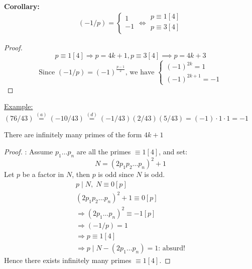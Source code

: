 \documentclass{report}
\begin{document}
\textbf{Corollary:}\[(-1/p)=\left \{ \begin{array}{lcl}
																			1\\
																			-1\\
																			\end{array}
																			\right. \iff 
																			\begin{array}{lcl}
																			p\equiv 1[4]\\
																			p\equiv 3[4]\\
																			\end{array}\]
\begin{proof}
							\[p\equiv1[4] \Rightarrow p=4k+1, p\equiv 3[4] \implies p=4k+3\]
							\[\text{Since }(-1/p)=(-1)^\frac{p-1}{2}\text{, we have  }
																											\left \{
																											\begin{array}{lcl}
																											(-1)^{2k}=1\\
																											(-1)^{2k+1}=-1
																											\end{array}
																											\right.
							\]
\end{proof}
\underline{Example:}   $(76/43)\overset{(a)}{=}(-10/43)\overset{(d)}{=}(-1/43)(2/43)(5/43)=(-1)\cdot 1 \cdot 1=-1$
\begin{thm}There are infinitely many primes of the form $4k+1$\end{thm}
\begin{proof}: Assume $p_1 \dots p_n$ are all the primes $\equiv 1[4]$, and set:
							\[ N=(2p_1p_2\dots p_n)^2+1\]
							Let $p$ be a factor in $N$, then $p$ is odd since $N$ is odd.
												\[\begin{array}{lcl}
													p\mid N, \; N\equiv 0[p]\\
													(2p_1p_2\dots p_n)^2+1\equiv 0[p]\\
													\Rightarrow (2p_1\dots p_n)^2\equiv -1[p]\\
													\Rightarrow (-1/p)=1\\
													\Rightarrow p\equiv 1[4]\\
													\Rightarrow p \mid N-(2p_1\dots p_n)=1\text{: absurd!}
													\end{array}
													\]
													Hence there exists infinitely many primes $\equiv 1[4]$.
\end{proof}						
						

\newpage
\end{document}
